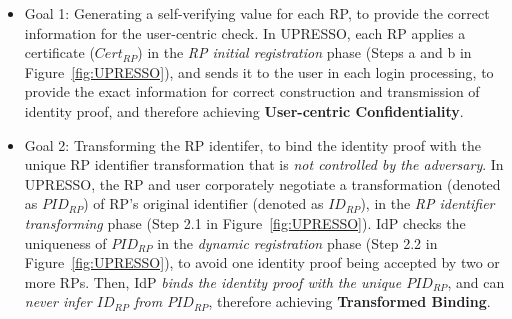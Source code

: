 \begin{itemize}
 \item Goal 1: Generating a self-verifying value for each RP, to provide the correct information for the user-centric check.
  In UPRESSO, each RP applies a certificate ($Cert_{RP}$) in the \emph{RP initial registration} phase (Steps a and b in Figure~\ref{fig:UPRESSO}),
  and sends it to the user in each login processing,
  to provide the exact information for  correct construction and transmission of identity proof,
             and therefore achieving \textbf{User-centric Confidentiality}.




    \item Goal 2: Transforming the RP identifer, to bind the identity proof with the unique RP identifier transformation that is \emph{not controlled by the adversary}.
  In UPRESSO, the RP and user corporately negotiate a transformation (denoted as $PID_{RP}$) of RP's original identifier (denoted as $ID_{RP}$), in the \emph{RP identifier transforming} phase (Step 2.1 in Figure~\ref{fig:UPRESSO}).
  IdP checks the uniqueness of $PID_{RP}$ in the \emph{dynamic registration} phase (Step 2.2 in Figure~\ref{fig:UPRESSO}),  to avoid one identity proof being accepted by two or more RPs.
  Then, IdP  \emph{binds the identity proof with the unique $PID_{RP}$}, and  can \emph{ never infer $ID_{RP}$ from $PID_{RP}$},
   therefore achieving \textbf{Transformed Binding}.


\end{itemize}
